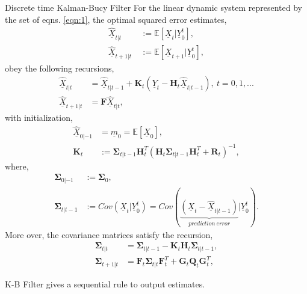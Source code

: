 \documentclass[a4paper,english,12pt]{article}
\begin{document}
\begin{thm}{Discrete time Kalman-Bucy Filter}
  For the linear dynamic system represented by the set of eqns. \eqref{eqn:1}, the optimal squared error estimates,
  \begin{align*}
  \underline{\hat{X}}_{t|t}\ &:= \mathbb{E}[\underline{X}_t|\underline{Y}_0^t],\\
  \underline{\hat{X}}_{t+1|t}\ &:= \mathbb{E}[\underline{X}_{t+1}|\underline{Y}_0^t],
  \end{align*}
obey the following recursions,
\begin{align}
\underline{\hat{X}}_{t|t}&=\underline{\hat{X}}_{t|t-1} + \textbf{K}_t(\underline{Y}_t-\textbf{H}_t\underline{\hat{X}}_{t|t-1}), ~t=0,1,...\label{eqn:M1}\\
\underline{\hat{X}}_{t+1|t}&=\textbf{F}\underline{\hat{X}}_{t|t},\label{eqn:T1}
 \end{align}
 with initialization,
 \begin{align*}
 \underline{\hat{X}}_{0|-1}&=\underline{m}_0=\mathbb{E}[\underline{X}_0],\\
 \textbf{K}_t&:= \mathbf{\Sigma}_{t|t-1} \textbf{H}_t^T(\textbf{H}_t \mathbf{\Sigma}_{t|t-1}\textbf{H}_t^T+\textbf{R}_t)^{-1},
 \end{align*}
 where,
 \begin{align*}
 \mathbf{\Sigma}_{0|-1}&:= \mathbf{\Sigma}_0,\\
 \mathbf{\Sigma}_{t|t-1}&:= Cov(\underline{X}_t|\underline{Y}_0^t)=Cov(\underbrace{(\underline{X}_t-\underline{\hat{X}}_{t|t-1})}_{prediction\ error}|\underline{Y}_0^t).
 \end{align*}
 More over, the covariance matrices satisfy the recursion,
 \begin{align}
\mathbf{\Sigma}_{t|t}&=\mathbf{\Sigma}_{t|t-1}-\textbf{K}_t\textbf{H}_t\mathbf{\Sigma}_{t|t-1},\label{eqn:M2}\\
\mathbf{\Sigma}_{t+1|t}&=\textbf{F}_t\mathbf{\Sigma}_{t|t}\textbf{F}_t^T + \textbf{G}_t\textbf{Q}_t\textbf{G}_t^T,\label{eqn:T2}
 \end{align}   
\end{thm} 
\begin{rem}
K-B Filter gives a sequential rule to output estimates.
\end{rem}
\end{document}
